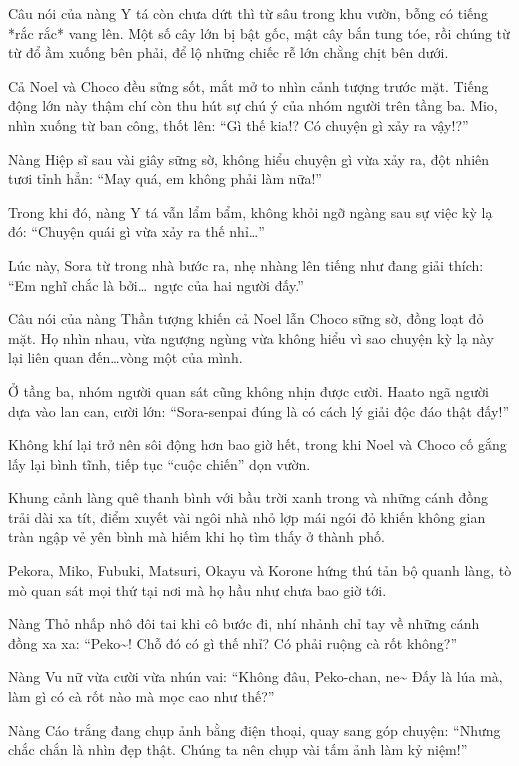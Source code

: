 \documentclass[../main.tex]{subfiles}
\begin{document}
Câu nói của nàng Y tá còn chưa dứt thì từ sâu trong khu vườn, bỗng có tiếng *rắc rắc* vang lên. Một số cây lớn bị bật gốc, mật cây bắn tung tóe, rồi chúng từ từ đổ ầm xuống bên phải, để lộ những chiếc rễ lớn chằng chịt bên dưới.

Cả Noel và Choco đều sửng sốt, mắt mở to nhìn cảnh tượng trước mặt. Tiếng động lớn này thậm chí còn thu hút sự chú ý của nhóm người trên tầng ba. Mio, nhìn xuống từ ban công, thốt lên: ``Gì thế kia!? Có chuyện gì xảy ra vậy!?''

Nàng Hiệp sĩ sau vài giây sững sờ, không hiểu chuyện gì vừa xảy ra, đột nhiên tươi tỉnh hẳn: ``May quá, em không phải làm nữa!''

Trong khi đó, nàng Y tá vẫn lẩm bẩm, không khỏi ngỡ ngàng sau sự việc kỳ lạ đó: ``Chuyện quái gì vừa xảy ra thế nhỉ\dots''

Lúc này, Sora từ trong nhà bước ra, nhẹ nhàng lên tiếng như đang giải thích: ``Em nghĩ chắc là bởi\dots\ ngực của hai người đấy.''

Câu nói của nàng Thần tượng khiến cả Noel lẫn Choco sững sờ, đồng loạt đỏ mặt. Họ nhìn nhau, vừa ngượng ngùng vừa không hiểu vì sao chuyện kỳ lạ này lại liên quan đến\dots vòng một của mình.

Ở tầng ba, nhóm người quan sát cũng không nhịn được cười. Haato ngã người dựa vào lan can, cười lớn: ``Sora-senpai đúng là có cách lý giải độc đáo thật đấy!''

Không khí lại trở nên sôi động hơn bao giờ hết, trong khi Noel và Choco cố gắng lấy lại bình tĩnh, tiếp tục ``cuộc chiến'' dọn vườn.

\ct

Khung cảnh làng quê thanh bình với bầu trời xanh trong và những cánh đồng trải dài xa tít, điểm xuyết vài ngôi nhà nhỏ lợp mái ngói đỏ khiến không gian tràn ngập vẻ yên bình mà hiếm khi họ tìm thấy ở thành phố.

Pekora, Miko, Fubuki, Matsuri, Okayu và Korone hứng thú tản bộ quanh làng, tò mò quan sát mọi thứ tại nơi mà họ hầu như chưa bao giờ tới.

Nàng Thỏ nhấp nhô đôi tai khi cô bước đi, nhí nhảnh chỉ tay về những cánh đồng xa xa: ``Peko\~{}! Chỗ đó có gì thế nhỉ? Có phải ruộng cà rốt không?''

Nàng Vu nữ vừa cười vừa nhún vai: ``Không đâu, Peko-chan, ne\~{} Đấy là lúa mà, làm gì có cà rốt nào mà mọc cao như thế?''

Nàng Cáo trắng đang chụp ảnh bằng điện thoại, quay sang góp chuyện: ``Nhưng chắc chắn là nhìn đẹp thật. Chúng ta nên chụp vài tấm ảnh làm kỷ niệm!''
\end{document}
